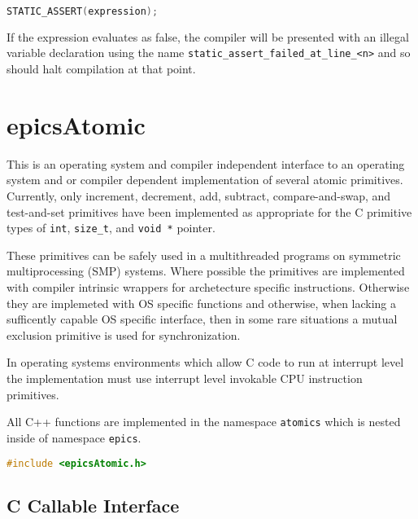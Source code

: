 \begin{lstlisting}[language=C]
STATIC_ASSERT(expression);
\end{lstlisting}

If the expression evaluates as false, the compiler will be presented with an illegal variable declaration using the name \verb|static_assert_failed_at_line_<n>| and so should halt compilation at that point.

\section{epicsAtomic}

This is an operating system and compiler independent interface to an operating system and or compiler dependent implementation of several atomic primitives.
Currently, only increment, decrement, add, subtract, compare-and-swap, and test-and-set primitives have been implemented as appropriate for the C primitive types of \verb|int|, \verb|size_t|, and \verb|void *| pointer.

These primitives can be safely used in a multithreaded programs on symmetric multiprocessing (SMP) systems.
Where possible the primitives are implemented with compiler intrinsic wrappers for archetecture specific instructions.
Otherwise they are implemeted with OS specific functions and otherwise, when lacking a sufficently capable OS specific interface, then in some rare situations a mutual exclusion primitive is used for synchronization.

In operating systems environments which allow C code to run at interrupt level the implementation must use interrupt level invokable CPU instruction primitives.

All C++ functions are implemented in the namespace \verb|atomics| which is nested inside of namespace \verb|epics|.

\begin{lstlisting}[language=C]
#include <epicsAtomic.h>
\end{lstlisting}

\subsection{C Callable Interface}

